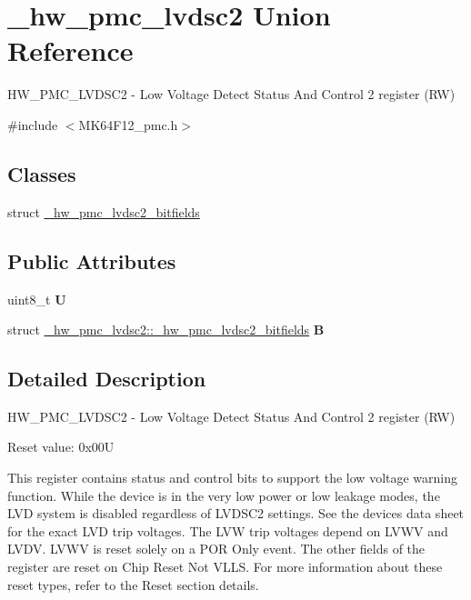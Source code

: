 \hypertarget{union__hw__pmc__lvdsc2}{}\section{\+\_\+hw\+\_\+pmc\+\_\+lvdsc2 Union Reference}
\label{union__hw__pmc__lvdsc2}


H\+W\+\_\+\+P\+M\+C\+\_\+\+L\+V\+D\+S\+C2 -\/ Low Voltage Detect Status And Control 2 register (RW)  




{\ttfamily \#include $<$M\+K64\+F12\+\_\+pmc.\+h$>$}

\subsection*{Classes}
\begin{DoxyCompactItemize}
\item 
struct \hyperlink{struct__hw__pmc__lvdsc2_1_1__hw__pmc__lvdsc2__bitfields}{\+\_\+hw\+\_\+pmc\+\_\+lvdsc2\+\_\+bitfields}
\end{DoxyCompactItemize}
\subsection*{Public Attributes}
\begin{DoxyCompactItemize}
\item 
uint8\+\_\+t {\bfseries U}\hypertarget{union__hw__pmc__lvdsc2_aed72341b7e592166e6bbb90a5d4b80a9}{}\label{union__hw__pmc__lvdsc2_aed72341b7e592166e6bbb90a5d4b80a9}

\item 
struct \hyperlink{struct__hw__pmc__lvdsc2_1_1__hw__pmc__lvdsc2__bitfields}{\+\_\+hw\+\_\+pmc\+\_\+lvdsc2\+::\+\_\+hw\+\_\+pmc\+\_\+lvdsc2\+\_\+bitfields} {\bfseries B}\hypertarget{union__hw__pmc__lvdsc2_a29c659bbeafa376742e8593c370ca2d1}{}\label{union__hw__pmc__lvdsc2_a29c659bbeafa376742e8593c370ca2d1}

\end{DoxyCompactItemize}


\subsection{Detailed Description}
H\+W\+\_\+\+P\+M\+C\+\_\+\+L\+V\+D\+S\+C2 -\/ Low Voltage Detect Status And Control 2 register (RW) 

Reset value\+: 0x00U

This register contains status and control bits to support the low voltage warning function. While the device is in the very low power or low leakage modes, the L\+VD system is disabled regardless of L\+V\+D\+S\+C2 settings. See the device\textquotesingle{}s data sheet for the exact L\+VD trip voltages. The L\+VW trip voltages depend on L\+V\+WV and L\+V\+DV. L\+V\+WV is reset solely on a P\+OR Only event. The other fields of the register are reset on Chip Reset Not V\+L\+LS. For more information about these reset types, refer to the Reset section details. 

